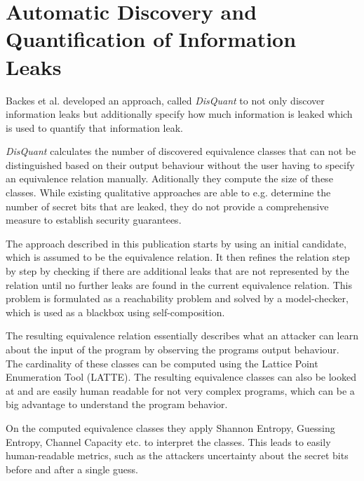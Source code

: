 \documentclass[a4paper,UKenglish]{lipics-v2018}
\begin{document}


\section{Automatic Discovery and Quantification of Information Leaks}

Backes et al. developed an approach, called \textit{DisQuant} to not only discover information leaks but additionally specify how much information is leaked which is used to quantify that information leak.\cite{automatic_discovery_and_quantification}

\textit{DisQuant} calculates the number of discovered equivalence classes that can not be distinguished based on their output behaviour without the user having to specify an equivalence relation manually. Aditionally they compute the size of these classes. While existing qualitative approaches are able to e.g. determine the number of secret bits that are leaked, they do not provide a comprehensive measure to establish security guarantees.\cite{automatic_discovery_and_quantification}

The approach described in this publication starts by using an initial candidate, which is assumed to be the equivalence relation. It then refines the relation step by step by checking if there are additional leaks that are not represented by the relation until no further leaks are found in the current equivalence relation. This problem is formulated as a reachability problem and solved by a model-checker, which is used as a blackbox using self-composition.\cite{automatic_discovery_and_quantification}

The resulting equivalence relation essentially describes what an attacker can learn about the input of the program by observing the programs output behaviour. The cardinality of these classes can be computed using the Lattice Point Enumeration Tool (LATTE). The resulting equivalence classes can also be looked at and are easily human readable for not very complex programs, which can be a big advantage to understand the program behavior.
\cite{automatic_discovery_and_quantification}

On the computed equivalence classes they apply Shannon Entropy, Guessing Entropy, Channel Capacity etc. to interpret the classes. This leads to easily human-readable metrics, such as the attackers uncertainty about the secret bits before and after a single guess.\cite{automatic_discovery_and_quantification}
\end{document}
